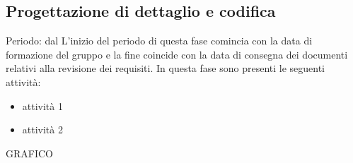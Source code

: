\subsection{Progettazione di dettaglio e codifica}
Periodo: dal
L'inizio del periodo di questa fase comincia con la data di formazione del gruppo e la fine coincide con la data di consegna dei documenti relativi alla revisione dei requisiti. In questa fase sono presenti le seguenti attività:
\begin{itemize}
\item attività 1
\item attività 2
\end{itemize}

GRAFICO